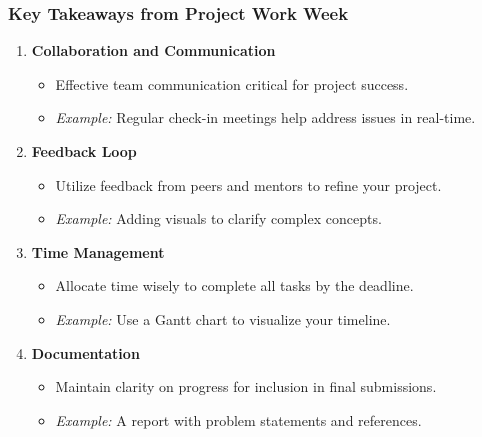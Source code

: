 \documentclass{beamer}
\begin{document}
\begin{frame}[fragile]
    \frametitle{Key Takeaways from Project Work Week}
    \begin{enumerate}
        \item \textbf{Collaboration and Communication}  
        \begin{itemize}
            \item Effective team communication critical for project success.
            \item \textit{Example:} Regular check-in meetings help address issues in real-time.
        \end{itemize}
        
        \item \textbf{Feedback Loop}  
        \begin{itemize}
            \item Utilize feedback from peers and mentors to refine your project.
            \item \textit{Example:} Adding visuals to clarify complex concepts.
        \end{itemize}
        
        \item \textbf{Time Management}  
        \begin{itemize}
            \item Allocate time wisely to complete all tasks by the deadline.
            \item \textit{Example:} Use a Gantt chart to visualize your timeline.
        \end{itemize}
        
        \item \textbf{Documentation}  
        \begin{itemize}
            \item Maintain clarity on progress for inclusion in final submissions.
            \item \textit{Example:} A report with problem statements and references.
        \end{itemize}
    \end{enumerate}
\end{frame}
\end{document}
